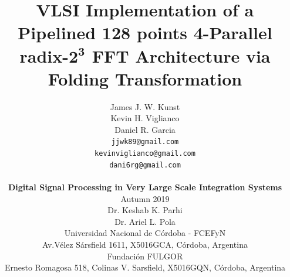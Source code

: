 \documentclass[journal,comsoc]{IEEEtran}
\begin{document}
\title{
\huge \bf VLSI Implementation of a Pipelined 128 points 4-Parallel radix-$\mathbf{2^3}$ FFT Architecture via Folding Transformation\\
}
\author{
\begin{minipage}{0.4\linewidth}
	\raggedleft
	James J. W. Kunst\\
	Kevin H. Viglianco\\
	Daniel R. Garcia
\end{minipage}
\begin{minipage}{0.4\linewidth}
	\raggedright	
	{\tt\small jjwk89@gmail.com}\\
	{\tt\small kevinviglianco@gmail.com}\\	
	{\tt\small dani6rg@gmail.com}			
\end{minipage}			
\\		
[0.5cm]
{\large \bf Digital Signal Processing in Very Large Scale Integration Systems}\\
[0.5cm]
Autumn 2019\\
[0.5cm]
Dr. Keshab K. Parhi	\\
Dr. Ariel L. Pola	\\
[0.5cm]
Universidad Nacional de Córdoba - FCEFyN\\
Av.Vélez Sársfield 1611, X5016GCA, C\'ordoba, Argentina\\
[0.5cm]
Fundación FULGOR\\
Ernesto Romagosa 518, Colinas V. Sarsfield, X5016GQN, Córdoba, Argentina%
}
\maketitle
\end{document}

